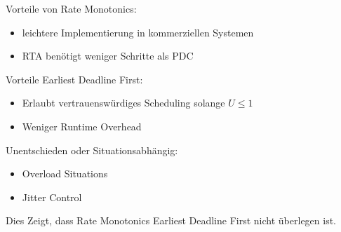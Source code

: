 \begin{frame}{Vorteile von Rate Monotonics:}
	\begin{itemize}
		\item leichtere Implementierung in kommerziellen Systemen
		\item RTA benötigt weniger Schritte als PDC
	\end{itemize}
\end{frame}

\begin{frame}{Vorteile Earliest Deadline First:}
	\begin{itemize}
		\item Erlaubt vertrauenswürdiges Scheduling solange $U \leq 1$
		\item Weniger Runtime Overhead
	\end{itemize}
\end{frame}

\begin{frame}{Unentschieden oder Situationsabhängig:}
	\begin{itemize}
		\item Overload Situations
		\item Jitter Control
	\end{itemize}
\end{frame}
Dies Zeigt, dass Rate Monotonics Earliest Deadline First nicht überlegen ist.